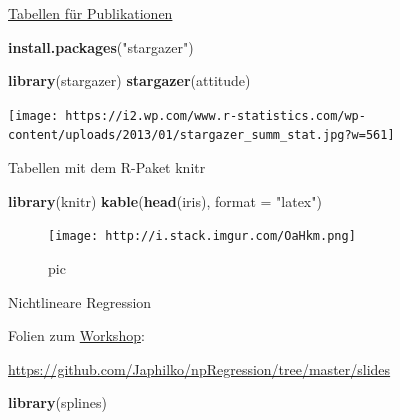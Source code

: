 \documentclass[
  ignorenonframetext,
]{beamer}
\newenvironment{Shaded}{}{}
\newcommand{\DataTypeTok}[1]{\textcolor[rgb]{0.56,0.13,0.00}{#1}}
\newcommand{\KeywordTok}[1]{\textcolor[rgb]{0.00,0.44,0.13}{\textbf{#1}}}
\newcommand{\NormalTok}[1]{#1}
\newcommand{\StringTok}[1]{\textcolor[rgb]{0.25,0.44,0.63}{#1}}
\begin{document}
\begin{frame}[fragile]{\href{https://www.r-statistics.com/2013/01/stargazer-package-for-beautiful-latex-tables-from-r-statistical-models-output/}{Tabellen
für Publikationen}}
\protect\hypertarget{tabellen-fur-publikationen}{}

\begin{Shaded}
\begin{Highlighting}[]
\KeywordTok{install.packages}\NormalTok{(}\StringTok{"stargazer"}\NormalTok{)}
\end{Highlighting}
\end{Shaded}

\begin{Shaded}
\begin{Highlighting}[]
\KeywordTok{library}\NormalTok{(stargazer)}
\KeywordTok{stargazer}\NormalTok{(attitude)}
\end{Highlighting}
\end{Shaded}

\texttt{[image: https://i2.wp.com/www.r-statistics.com/wp-content/uploads/2013/01/stargazer\_summ\_stat.jpg?w=561]}

\end{frame}

\begin{frame}[fragile]{Tabellen mit dem R-Paket knitr}
\protect\hypertarget{tabellen-mit-dem-r-paket-knitr}{}

\begin{Shaded}
\begin{Highlighting}[]
\KeywordTok{library}\NormalTok{(knitr)}
\KeywordTok{kable}\NormalTok{(}\KeywordTok{head}\NormalTok{(iris), }\DataTypeTok{format =} \StringTok{"latex"}\NormalTok{)}
\end{Highlighting}
\end{Shaded}

\begin{figure}
\centering
\texttt{[image: http://i.stack.imgur.com/OaHkm.png]}
\caption{pic}
\end{figure}

\end{frame}

\begin{frame}[fragile]{Nichtlineare Regression}
\protect\hypertarget{nichtlineare-regression}{}

Folien zum
\href{https://github.com/Japhilko/npRegression/tree/master/slides}{Workshop}:

\url{https://github.com/Japhilko/npRegression/tree/master/slides}

\begin{Shaded}
\begin{Highlighting}[]
\KeywordTok{library}\NormalTok{(splines)}
\end{Highlighting}
\end{Shaded}

\end{frame}
\end{document}
